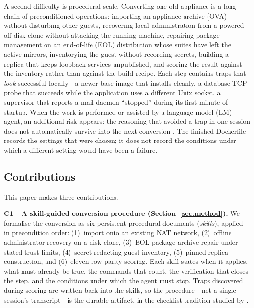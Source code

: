 \documentclass[3p,twocolumn,authoryear]{elsarticle}
\begin{document}
A second difficulty is procedural scale. Converting one old appliance
is a long chain of preconditioned operations: importing an appliance
archive (OVA) without disturbing other guests, recovering local
administration from a powered-off disk clone without attacking the
running machine, repairing package management on an end-of-life (EOL)
distribution whose suites have left the active mirrors, inventorying
the guest without recording secrets, building a replica that keeps
loopback services unpublished, and scoring the result against the
inventory rather than against the build recipe. Each step contains
traps that \emph{look} successful locally---a newer base image that
installs cleanly, a database TCP probe that succeeds while the
application uses a different Unix socket, a supervisor that reports a
mail daemon ``stopped'' during its first minute of startup. When the
work is performed or assisted by a language-model (LM) agent, an
additional risk appears: the reasoning that avoided a trap in one
session does not automatically survive into the next conversion
\citep{yao2023}. The finished Dockerfile records the settings that
were chosen; it does not record the conditions under which a different
setting would have been a failure.

\subsection{Contributions}

This paper makes three contributions.

\textbf{C1---A skill-guided conversion procedure (Section~\ref{sec:method}).}
We formalise the conversion as six persistent procedural documents
(\emph{skills}), applied in precondition order: (1)~import onto an
existing NAT network, (2)~offline administrator recovery on a disk
clone, (3)~EOL package-archive repair under stated trust limits,
(4)~secret-redacting guest inventory, (5)~pinned replica construction,
and (6)~eleven-row parity scoring. Each skill states when it applies,
what must already be true, the commands that count, the verification
that closes the step, and the conditions under which the agent must
stop. Traps discovered during scoring are written back into the skills,
so the procedure---not a single session's transcript---is the durable
artifact, in the checklist tradition studied by \citet{haynes2009}.
\end{document}
